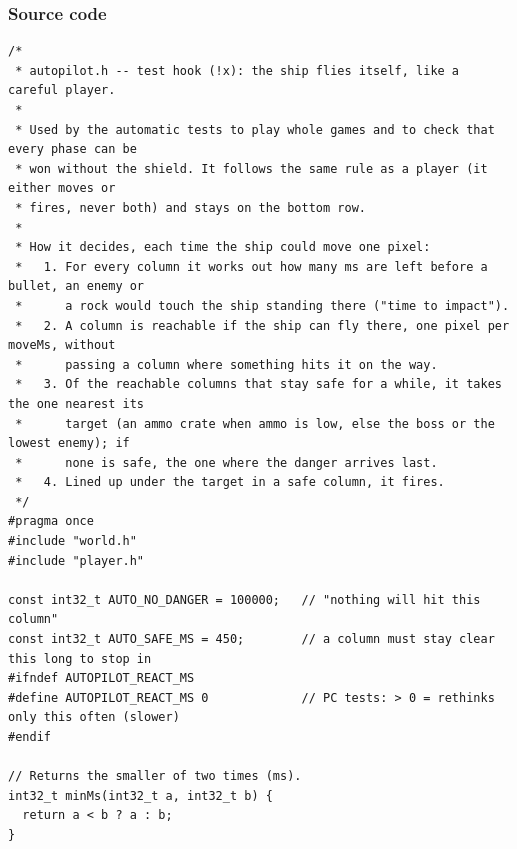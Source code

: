 \documentclass[11pt,a4paper]{article}
\begin{document}
\subsubsection*{Source code}
\begin{lstlisting}[language=Arduino]
/*
 * autopilot.h -- test hook (!x): the ship flies itself, like a careful player.
 *
 * Used by the automatic tests to play whole games and to check that every phase can be
 * won without the shield. It follows the same rule as a player (it either moves or
 * fires, never both) and stays on the bottom row.
 *
 * How it decides, each time the ship could move one pixel:
 *   1. For every column it works out how many ms are left before a bullet, an enemy or
 *      a rock would touch the ship standing there ("time to impact").
 *   2. A column is reachable if the ship can fly there, one pixel per moveMs, without
 *      passing a column where something hits it on the way.
 *   3. Of the reachable columns that stay safe for a while, it takes the one nearest its
 *      target (an ammo crate when ammo is low, else the boss or the lowest enemy); if
 *      none is safe, the one where the danger arrives last.
 *   4. Lined up under the target in a safe column, it fires.
 */
#pragma once
#include "world.h"
#include "player.h"

const int32_t AUTO_NO_DANGER = 100000;   // "nothing will hit this column"
const int32_t AUTO_SAFE_MS = 450;        // a column must stay clear this long to stop in
#ifndef AUTOPILOT_REACT_MS
#define AUTOPILOT_REACT_MS 0             // PC tests: > 0 = rethinks only this often (slower)
#endif

// Returns the smaller of two times (ms).
int32_t minMs(int32_t a, int32_t b) {
  return a < b ? a : b;
}


\end{lstlisting}
\end{document}
